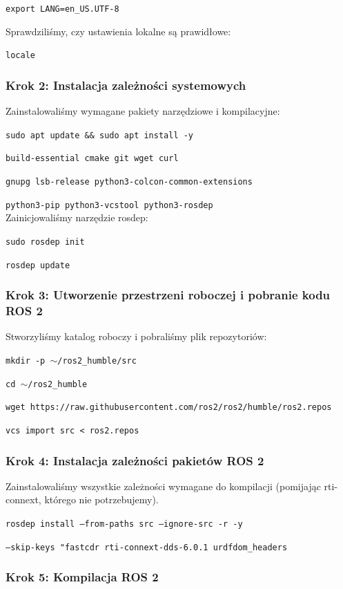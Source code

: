 \documentclass[12pt]{article}
\begin{document}
\texttt{export LANG=en\_US.UTF-8}

Sprawdziliśmy, czy ustawienia lokalne są prawidłowe:

\texttt{locale}

\subsubsection{Krok 2: Instalacja zależności systemowych}
Zainstalowaliśmy wymagane pakiety narzędziowe i kompilacyjne:

\texttt{sudo apt update \&\& sudo apt install -y}


\texttt{build-essential cmake git wget curl}


\texttt{gnupg lsb-release python3-colcon-common-extensions}


\texttt{python3-pip python3-vcstool python3-rosdep}
\\

Zainicjowaliśmy narzędzie rosdep:

\texttt{sudo rosdep init}


\texttt{rosdep update}


\subsubsection{Krok 3: Utworzenie przestrzeni roboczej i pobranie kodu ROS 2}

Stworzyliśmy katalog roboczy i pobraliśmy plik repozytoriów:


\texttt{mkdir -p $\sim$/ros2\_humble/src}

\texttt{cd $\sim$/ros2\_humble}

\texttt{wget https://raw.githubusercontent.com/ros2/ros2/humble/ros2.repos}

\texttt{vcs import src < ros2.repos}

\subsubsection{Krok 4: Instalacja zależności pakietów ROS 2}

Zainstalowaliśmy wszystkie zależności wymagane do kompilacji (pomijając rti-connext, którego nie potrzebujemy).


\texttt{rosdep install --from-paths src --ignore-src -r -y}

\texttt{--skip-keys "fastcdr rti-connext-dds-6.0.1 urdfdom\_headers}


\subsubsection{Krok 5: Kompilacja ROS 2}
\end{document}
